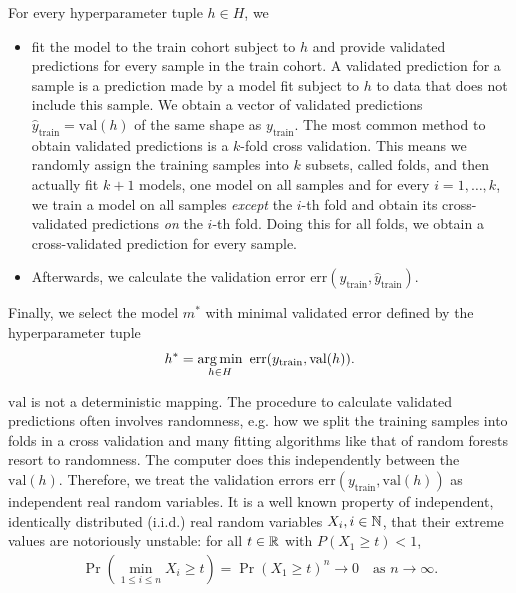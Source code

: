 For every hyperparameter tuple $h \in H$, we
\begin{itemize}
    \item fit the model to the train cohort subject to $h$ and provide validated predictions for 
        every sample in the train cohort.
        A validated prediction for a sample is a prediction made by a model fit 
        subject to $h$ to data that does not include this sample. We obtain a vector of validated 
        predictions $\hat{y}_\text{train} = \text{val}(h)$ of the same shape as $y_\text{train}$.
        The most common method to obtain validated predictions is a $k$-fold cross validation.
        This means we randomly assign the training samples into $k$ subsets, called folds, and then actually 
        fit $k+1$ models, one model on all samples and for every $i = 1, \ldots, k$, we train a model
        on all samples \textit{except} the $i$-th fold and obtain its cross-validated predictions 
        \textit{on} the $i$-th fold. Doing this for all folds, 
        we obtain a cross-validated prediction for every sample.
    \item Afterwards, we calculate the validation error 
        $\text{err}(y_\text{train}, \hat{y}_\text{train})$.
\end{itemize}

Finally, we select the model $m^*$ with minimal validated error defined by the hyperparameter tuple 
\begin{align}
    h^* = \operatorname*{arg\,min}_{h \in H} \ \text{err}(y_\text{train}, \text{val}(h)).
\end{align}

$\text{val}$ is not a deterministic mapping. The procedure to calculate validated predictions often 
involves randomness, e.g. how we split the training samples into folds in a cross validation and 
many fitting algorithms like that of random forests resort to randomness. The computer does this 
independently between the $\text{val}(h)$. Therefore, we treat the validation errors
$\text{err}(y_\text{train}, \text{val}(h))$ as independent 
real random variables. It is a well known property of independent, identically distributed (i.i.d.) 
real random variables $X_i, i \in \mathbb{N}$, that their extreme values are notoriously unstable: for all 
$t \in \mathbb{R}$ with $P(X_1 \geq t) < 1$, 
\begin{align}
    \Pr\left( \min_{1 \leq i \leq n} X_i \geq t \right) = \Pr(X_1 \geq t)^n \to 0 \quad
    \text{as } n \to \infty.
\end{align}

